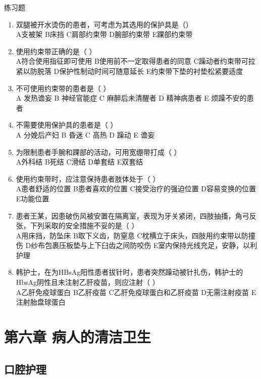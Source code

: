 \documentclass[11pt, a4paper]{ctexart}
\begin{document}
\begin{examplebox}{练习题}
	\begin{enumerate}
		\item 双腿被开水烫伤的患者，可考虑为其选用的保护具是（\qquad）\\
		      A支被架 \quad B床挡 \quad C肩部约束带 \quad D腕部约束带 \quad E踝部约束带
		\item 使用约束带正确的是（ ）\\
		      A符合使用指征即可使用 \quad B使用前不一定取得患者的同意 \quad C躁动者约束带可拉紧以防脱落 \quad D保护性制动时间可随意延长 \quad E约束带下垫的衬垫松紧要适度
		\item 不可使用约束带的患者是（ ）\\
		      A 发热谵妄 \quad B 神经官能症 \quad C 麻醉后未清醒者 \quad D 精神病患者 \quad E 烦躁不安的患者
		\item 不需要使用保护具的患者是（ ）\\
		      A 分娩后产妇 \quad B 昏迷 \quad C 高热 \quad D 躁动 \quad E 谵妄
		\item 为限制患者手腕和踝部的活动，可用宽绷带打成（ ）\\
		      A外科结 \quad B死结 \quad C滑结 \quad D单套结 \quad E双套结
		\item 使用约束带时，应注意保持患者肢体处于（ ）\\
		      A患者舒适的位置 \quad B患者喜欢的位置 \quad C接受治疗的强迫位置 \quad D容易变换的位置 \quad E功能位置
		\item 患者王某，因患破伤风被安置在隔离室，表现为牙关紧闭，四肢抽搐，角弓反张，下列采取的安全措施不妥的是（ ）\\
		      A用床挡，防坠床 \quad B取下义齿，防窒息 \quad C枕横立于床头，四肢用约束带以防撞伤 \quad D纱布包裹压板垫与上下臼齿之间防咬伤 \quad E室内保持光线充足，安静，以利护理
		\item 韩护士，在为HBsAg阳性患者拔针时，患者突然躁动被针扎伤，韩护士的HbsAg阴性且未注射乙肝疫苗，则应注射（ ）\\
		      A乙肝免疫球蛋白 \quad B乙肝疫苗 \quad C乙肝免疫球蛋白和乙肝疫苗 \quad D无需注射疫苗 \quad E注射胎盘球蛋白
	\end{enumerate}
\end{examplebox}

\section{第六章 病人的清洁卫生}
\subsection{口腔护理}
\end{document}
